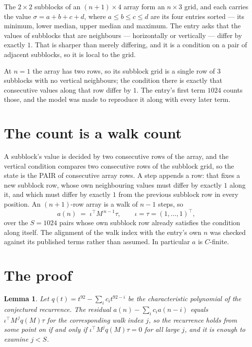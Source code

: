 \documentclass[11pt,a4paper]{article}
\theoremstyle{plain}
\newtheorem{lemma}[theorem]{Lemma}
\theoremstyle{definition}
\begin{document}
The $2\times2$ subblocks of an $(n+1)\times4$ array form an
$n\times3$ grid, and each carries the value $\sigma=a+b+c+d$, where $a\le b\le c\le d$ are its four entries sorted --- its minimum, lower median, upper median and maximum. The entry asks that the values of
subblocks that are neighbours --- horizontally or vertically --- differ by exactly $1$.
That is sharper than merely differing, and it is a condition on a pair of adjacent subblocks,
so it is local to the grid.

At $n=1$ the array has two rows, so its subblock grid is a single row of $3$ subblocks with
no vertical neighbours; the condition there is exactly that consecutive values along that row
differ by $1$. The entry's first term $1024$ counts those, and the model was made to
reproduce it along with every later term.

\section{The count is a walk count}

A subblock's value is decided by two consecutive rows of the array, and the
vertical condition compares two consecutive rows of the subblock grid, so the state is the
PAIR of consecutive array rows. A step appends a row: that fixes a new subblock row, whose own
neighbouring values must differ by exactly $1$ along it, and which must differ by exactly
$1$ from the previous subblock row in every position. An $(n+1)$-row array is a walk of
$n-1$ steps, so
\[
a(n)\;=\;\iota^{\!\top}M^{\,n-1}\tau,\qquad\iota=\tau=(1,\dots,1)^{\!\top},
\]
over the $S=1024$ pairs whose own subblock row already satisfies the condition along itself.
The alignment of the walk index with the entry's own $n$ was checked against its published
terms rather than assumed. In particular $a$ is $C$-finite.

\section{The proof}

\begin{lemma}\label{lem:crit}
Let $q(t)=t^{92}-\sum_i c_it^{92-i}$ be the characteristic polynomial of the
conjectured recurrence. The residual $a(n)-\sum_ic_ia(n-i)$ equals
$\iota^{\!\top}M^{\,j}q(M)\tau$ for the corresponding walk index $j$, so the recurrence
holds from some point on if and only if $\iota^{\!\top}M^{j}q(M)\tau=0$ for all large $j$,
and it is enough to examine $j<S$.
\end{lemma}
\end{document}
